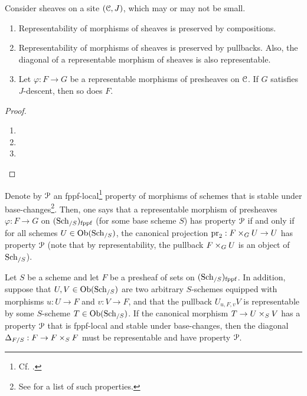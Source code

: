             \begin{lemma} \label{lemma: permanence_of_properties_of_representable_morphisms}
                Consider sheaves on a site $(\mathcal{C}, J)$, which may or may not be small.
                    \begin{enumerate}
                        \item Representability of morphisms of sheaves is preserved by compositions.
                        \item Representability of morphisms of sheaves is preserved by pullbacks. Also, the diagonal of a representable morphism of sheaves is also representable.
                        \item Let $\varphi: F \to G$ be a representable morphisms of presheaves on $\mathcal{C}$. If $G$ satisfies $J$-descent, then so does $F$.
                    \end{enumerate}
            \end{lemma}
                \begin{proof}
                    \noindent
                    \begin{enumerate}
                        \item 
                        \item 
                        \item 
                    \end{enumerate}
                \end{proof}
            \begin{definition} \label{def: properties_of_representable_morphisms_of_fppf_sheaves}
                Denote by $\mathcal{P}$ an fppf-local\footnote{Cf. \cite[\href{https://stacks.math.columbia.edu/tag/02KO}{Tag 02KO}]{stacks}.} property of morphisms of schemes that is stable under base-changes\footnote{See \cite[\href{https://stacks.math.columbia.edu/tag/02WE}{Tag 02WE}]{stacks} for a list of such properties.}. Then, one says that a representable morphism of presheaves $\varphi: F \to G$ on $(\mathrm{Sch}_{/S})_{\mathrm{fppf}}$ (for some base scheme $S$) has property $\mathcal{P}$ if and only if for all schemes $U \in \mathrm{Ob}(\mathrm{Sch}_{/S})$, the canonical projection $\pr_2: F \x_G U \to U$ has property $\mathcal{P}$ (note that by representability, the pullback $F \x_G U$ is an object of $\mathrm{Sch}_{/S}$).
            \end{definition}
            \begin{proposition} \label{prop: representability_criterion_for_diagonals}
                Let $S$ be a scheme and let $F$ be a presheaf of sets on $(\mathrm{Sch}_{/S})_{\mathrm{fppf}}$. In addition, suppose that $U, V \in \mathrm{Ob}(\mathrm{Sch}_{/S})$ are two arbitrary $S$-schemes equipped with morphisms $u: U \to F$ and $v: V \to F$, and that the pullback $U_{u, F, v} V$ is representable by some $S$-scheme $T \in \mathrm{Ob}(\mathrm{Sch}_{/S})$. If the canonical morphism $T \to U \x_S V$ has a property $\mathcal{P}$ that is fppf-local and stable under base-changes, then the diagonal $\Delta_{F/S}: F \to F \x_S F$ must be representable and have property $\mathcal{P}$.
            \end{proposition}
